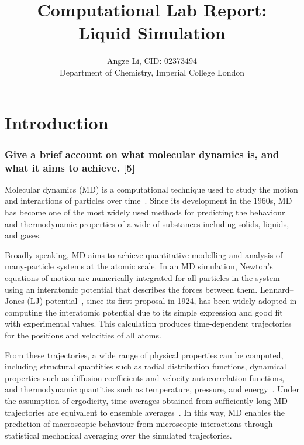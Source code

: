 \documentclass[a4paper,10pt,twocolumn]{article}
\title{\textbf{Computational Lab Report: \\
Liquid Simulation}}
\author{Angze Li, CID: 02373494 \\
    Department of Chemistry, Imperial College London}
\begin{document}
\maketitle

\section{Introduction}  %

\subsubsection*{Give a brief account on what molecular dynamics is, and what it aims to achieve. [5]}

Molecular dynamics (MD) is a computational technique used to study the motion and interactions of particles over time~\cite{leimkuhler2015molecular}. Since its development in the 1960s, MD has become one of the most widely used methods for predicting the behaviour and thermodynamic properties of a wide of substances including solids, liquids, and gases. 

Broadly speaking, MD aims to achieve quantitative modelling and analysis of many-particle systems at the atomic scale. In an MD simulation, Newton’s equations of motion are numerically integrated for all particles in the system using an interatomic potential that describes the forces between them. Lennard--Jones (LJ) potential~\cite{wang2020lennard}, since its first proposal in 1924,           has been widely adopted in computing the interatomic potential due to its simple expression and good fit with experimental values. This calculation produces time-dependent trajectories for the positions and velocities of all atoms.

From these trajectories, a wide range of physical properties can be computed, including structural quantities such as radial distribution functions, dynamical properties such as diffusion coefficients and velocity autocorrelation functions, and thermodynamic quantities such as temperature, pressure, and energy~\cite{van1990computer}. Under the assumption of ergodicity, time averages obtained from sufficiently long MD trajectories are equivalent to ensemble averages~\cite{cho1992ergodicity}. In this way, MD enables the prediction of macroscopic behaviour from microscopic interactions through statistical mechanical averaging over the simulated trajectories.
\end{document}
